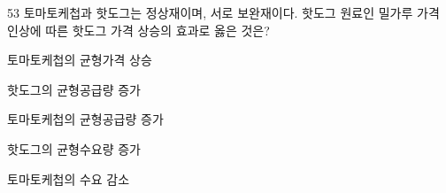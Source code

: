\begin{question}{53}
토마토케첩과 핫도그는 정상재이며, 서로 보완재이다. 핫도그 원료인 밀가루 가격 인상에 따른 핫도그 가격 상승의 효과로 옳은 것은?
\begin{choices}
  \item 토마토케첩의 균형가격 상승
  \item 핫도그의 균형공급량 증가
  \item 토마토케첩의 균형공급량 증가
  \item 핫도그의 균형수요량 증가
  \item 토마토케첩의 수요 감소
\end{choices}
\end{question}
